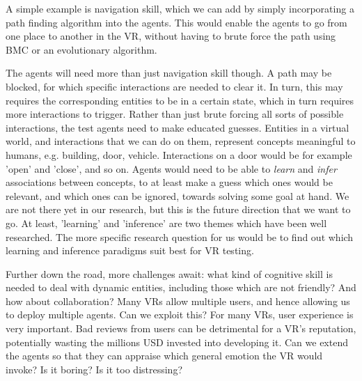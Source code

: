 \documentclass[sigplan]{acmart}\settopmatter{printfolios=false,printccs=false,printacmref=false}
\begin{document}
A simple example is navigation skill, which we can add by simply incorporating a path finding algorithm \cite{cui2011based}
into the agents. This would enable the agents to go from one place
to another in the VR, without having to brute force the path using BMC or an evolutionary algorithm.

The agents will need more than just navigation skill though. A path may be blocked, for which
specific interactions are needed to clear it. In turn, this may requires the corresponding entities to be
in a certain state, which in turn requires more interactions to trigger. Rather than just brute
forcing all sorts of possible interactions, the test agents need to make educated guesses.
Entities in a virtual world, and interactions that we can do on them, 
represent concepts meaningful to humans, e.g. building, door, vehicle. Interactions on a door
would be for example 'open' and 'close', and so on. Agents would need to be able to {\em learn} and {\em infer} associations between concepts, to at least make a guess which ones would be relevant,
and which ones can be ignored, towards solving some goal at hand. We are not there yet in our research,
but this is the future direction that we want to go. At least, 'learning' and 'inference' are two themes
which have been well researched. The more specific research question for us would be to find out which
learning and inference paradigms suit best for VR testing.

Further down the road, more challenges await:
what kind of cognitive skill is needed to deal with dynamic entities, including those which are
not friendly? And how about collaboration? Many VRs allow multiple users, and hence allowing us
to deploy multiple agents. Can we exploit this? 
For many VRs, user experience is very important.
Bad reviews from users can be detrimental for a VR's reputation, potentially wasting the
millions USD invested into developing it. Can we extend the agents so that they can appraise
which general emotion the VR would invoke? Is it boring? Is it too distressing?





\appendix  
\end{document}
